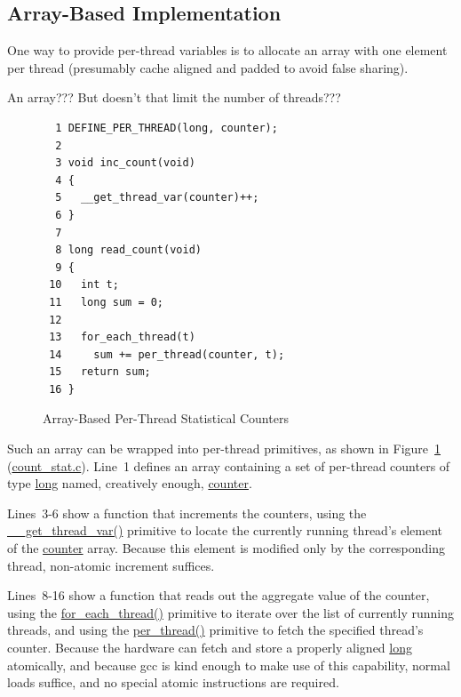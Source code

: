 \subsection{Array-Based Implementation}
\label{sec:count:Array-Based Implementation}

One way to provide per-thread variables is to allocate an array with
one element per
thread (presumably cache aligned and padded to avoid false sharing).

\QuickQuiz{}
	An array???
	But doesn't that limit the number of threads???
 \QuickQuizEnd

\begin{figure}[tbp]
{ \scriptsize
\begin{verbatim}
  1 DEFINE_PER_THREAD(long, counter);
  2 
  3 void inc_count(void)
  4 {
  5   __get_thread_var(counter)++;
  6 }
  7 
  8 long read_count(void)
  9 {
 10   int t;
 11   long sum = 0;
 12 
 13   for_each_thread(t)
 14     sum += per_thread(counter, t);
 15   return sum;
 16 }
\end{verbatim}
}
\caption{Array-Based Per-Thread Statistical Counters}
\label{fig:count:Array-Based Per-Thread Statistical Counters}
\end{figure}

Such an array can be wrapped into per-thread primitives, as shown in
Figure~\ref{fig:count:Array-Based Per-Thread Statistical Counters}
(\url{count_stat.c}).
Line~1 defines an array containing a set of per-thread counters of
type \url{long} named, creatively enough, \url{counter}.

Lines~3-6 show a function that increments the counters, using the
\url{__get_thread_var()} primitive to locate the currently running
thread's element of the \url{counter} array.
Because this element is modified only by the corresponding thread,
non-atomic increment suffices.

Lines~8-16 show a function that reads out the aggregate value of the counter,
using the \url{for_each_thread()} primitive to iterate over the list of
currently running threads, and using the \url{per_thread()} primitive
to fetch the specified thread's counter.
Because the hardware can fetch and store a properly aligned \url{long}
atomically, and because gcc is kind enough to make use of this capability,
normal loads suffice, and no special atomic instructions are required.

